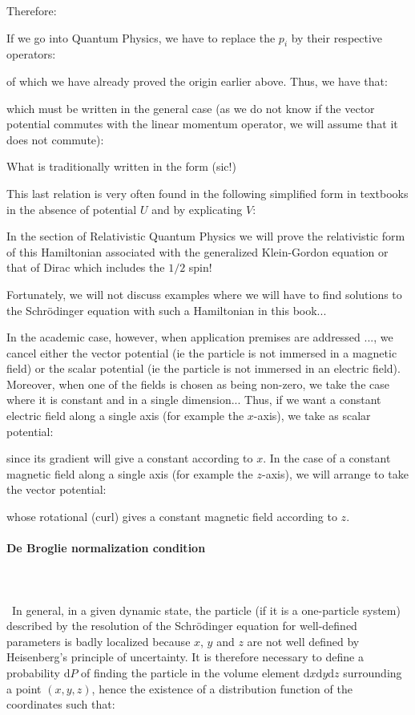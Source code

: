	Therefore:
	
	If we go into Quantum Physics, we have to replace the $p_i$ by their respective operators:
	
	of which we have already proved the origin earlier above. Thus, we have that:
	
	which must be written in the general case (as we do not know if the vector potential commutes with the linear momentum operator, we will assume that it does not commute):
	
	What is traditionally written in the form (sic!)
	
	This last relation is very often found in the following simplified form in textbooks in the absence of potential $U$ and by explicating $V$:
	
	\begin{tcolorbox}[title=Remark,colframe=black,arc=10pt]
	In the section of Relativistic Quantum Physics we will prove the relativistic form of this Hamiltonian associated with the generalized Klein-Gordon equation or that of Dirac which includes the $1/2$ spin!
	\end{tcolorbox}
	Fortunately, we will not discuss examples where we will have to find solutions to the Schrödinger equation with such a Hamiltonian in this book...
	
	In the academic case, however, when application premises are addressed ..., we cancel either the vector potential (ie the particle is not immersed in a magnetic field) or the scalar potential (ie the particle is not immersed in an electric field). Moreover, when one of the fields is chosen as being non-zero, we take the case where it is constant and in a single dimension... Thus, if we want a constant electric field along a single axis (for example the $x$-axis), we take as scalar potential:
	
	since its gradient will give a constant according to $x$. In the case of a constant magnetic field along a single axis (for example the $z$-axis), we will arrange to take the vector potential:
	
	whose rotational (curl) gives a constant magnetic field according to $z$.
	
	\paragraph{De Broglie normalization condition}\mbox{}\\\\\
	In general, in a given dynamic state, the particle (if it is a one-particle system) described by the resolution of the Schrödinger equation for well-defined parameters is badly localized because $x$, $y$ and $z$ are not well defined by Heisenberg's principle of uncertainty. It is therefore necessary to define a probability $\mathrm{d}P$ of finding the particle in the volume element $\mathrm{d}x\mathrm{d}y\mathrm{d}z$ surrounding a point $(x, y, z)$, hence the existence of a distribution function of the coordinates such that:
	
